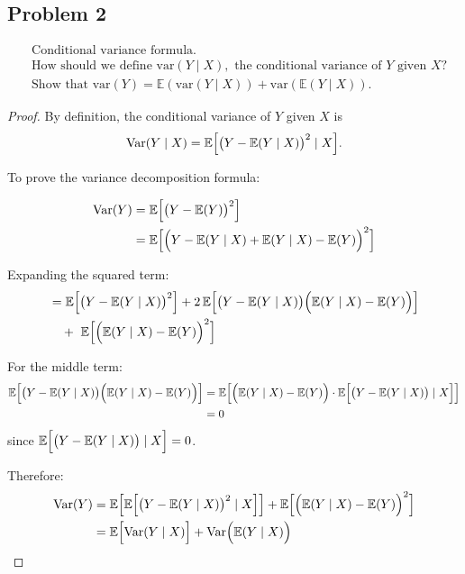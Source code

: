 \documentclass[letterpaper, 11pt]{article}
\newcommand{\1}{\mathds{1}}	%
\theoremstyle{definition}
\begin{document}
\subsection*{Problem 2}
\begin{align*}
    &\text{Conditional variance formula.} \\
    &\text{How should we define var}(Y \mid X), \text{ the conditional variance of } Y \text{ given } X\text{?} \\
    &\text{Show that var}(Y) = \mathbb{E}(\text{var}(Y \mid X)) + \text{var}(\mathbb{E}(Y \mid X)).
    \end{align*}
    \begin{proof}
        By definition, the conditional variance of \(Y\) given \(X\) is
        \[
        \operatorname{Var}(Y\mid X) = \mathbb{E}\Bigl[\bigl(Y - \mathbb{E}(Y\mid X)\bigr)^2\mid X\Bigr].
        \]
        
        To prove the variance decomposition formula:
        
        \begin{align*}
        \operatorname{Var}(Y)
        &=\mathbb{E}\Bigl[\bigl(Y-\mathbb{E}(Y)\bigr)^2\Bigr] \\
        &=\mathbb{E}\Bigl[\Bigl(Y-\mathbb{E}(Y\mid X)+\mathbb{E}(Y\mid X)-\mathbb{E}(Y)\Bigr)^2\Bigr] \\
        \end{align*}
        
        Expanding the squared term:
        \begin{align*}
        &=\mathbb{E}\Bigl[\bigl(Y-\mathbb{E}(Y\mid X)\bigr)^2\Bigr]
        + 2\,\mathbb{E}\Bigl[\bigl(Y-\mathbb{E}(Y\mid X)\bigr)\Bigl(\mathbb{E}(Y\mid X)-\mathbb{E}(Y)\Bigr)\Bigr] \\
        &\quad+\,\,\mathbb{E}\Bigl[\Bigl(\mathbb{E}(Y\mid X)-\mathbb{E}(Y)\Bigr)^2\Bigr] \\
        \end{align*}
        
        For the middle term:
        \begin{align*}
        \mathbb{E}\Bigl[\bigl(Y-\mathbb{E}(Y\mid X)\bigr)\Bigl(\mathbb{E}(Y\mid X)-\mathbb{E}(Y)\Bigr)\Bigr]
        &= \mathbb{E}\Bigl[\Bigl(\mathbb{E}(Y\mid X)-\mathbb{E}(Y)\Bigr) \cdot \mathbb{E}\Bigl[\bigl(Y-\mathbb{E}(Y\mid X)\bigr) \mid X\Bigr]\Bigr] \\
        &= 0
        \end{align*}
        since \(\mathbb{E}\Bigl[\bigl(Y-\mathbb{E}(Y\mid X)\bigr) \mid X\Bigr] = 0\).
        
        Therefore:
        \begin{align*}
        \operatorname{Var}(Y) 
        &= \mathbb{E}\Bigl[\mathbb{E}\Bigl[\bigl(Y-\mathbb{E}(Y\mid X)\bigr)^2 \mid X\Bigr]\Bigr] + \mathbb{E}\Bigl[\Bigl(\mathbb{E}(Y\mid X)-\mathbb{E}(Y)\Bigr)^2\Bigr] \\
        &= \mathbb{E}\Bigl[\operatorname{Var}(Y\mid X)\Bigr] + \operatorname{Var}\Bigl(\mathbb{E}(Y\mid X)\Bigr)
        \end{align*}
        \end{proof}
\end{document}

